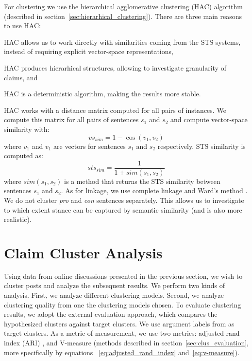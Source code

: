 For clustering we use the hierarchical agglomerative clustering (HAC) algorithm
(described in section~\ref{sec:hierarhical_clustering}). 
There are three main reasons to use HAC: 
\begin{enumerate*}
\item HAC allows us to work directly with similarities
coming from the STS systems, instead of requiring explicit vector-space representations, 
\item HAC produces hierarhical structures, allowing to investigate
granularity of claims, and
\item HAC is a deterministic algorithm, making the results more stable.
\end{enumerate*}
HAC works with a distance matrix computed for all pairs of instances. 
We compute this matrix for all pairs of sentences $s_1$ and $s_2$ and 
compute vector-space similarity with: 
$$
\mathit{vs_{sim}} = 1 - \cos(v_1, v_2)
$$ 
where $v_1$ and $v_1$ are vectors for sentences $s_1$ and $s_2$ respectively.
STS similarity is computed as:
$$
\mathit{sts_{sim}} = \frac{1}{1 + \mathit{sim}(s_1, s_2)}
$$
where $\mathit{sim}(s_1, s_2)$ is a method that returns the STS similarity
between sentences $s_1$ and $s_2$. 
As for linkage, we use complete linkage and Ward's method \citep{ward1963hierarchical}. 
We do not cluster \textit{pro} and \textit{con} sentences separately. 
This allows us to investigate to which extent stance can be captured by 
semantic similarity (and is also more realistic). 

\section{Claim Cluster Analysis}
\label{sec:argclu_analysis}

Using data from online discussions presented in the previous section, 
we wish to cluster posts and analyze the subsequent results. 
We perform two kinds of analysis. First, we analyze different clustering models. 
Second, we analyze clustering quality from one the clustering models chosen. 
To evaluate clustering results, we adopt the external evaluation approach, which compares the 
hypothesized clusters against target clusters. 
We use argument labels from \citet{hasan2014you} as target clusters. 
As a metric of measurement, we use two metrics: 
adjusted rand index (ARI) 
\citep{steinley2004properties}, and V-measure \citep{rosenberg2007v}
(methods described in section~\ref{sec:clus_evaluation}, more specifically by equations
~\ref{eq:adjusted_rand_index} and~\ref{eq:v-measure}). 

